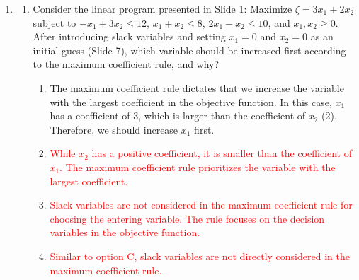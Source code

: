 \documentclass{article}%
\newcommand{\incorrect}[1]{\textcolor{red}{#1}}
\begin{document}
\begin{enumerate}
\begin{enumerate}
\item The correct answer is B. Pivoting is the core operation in the simplex method. It involves selecting a non-basic variable (the entering variable) to become basic and a basic variable (the leaving variable) to become non-basic. This is done based on specific rules to improve the objective function. Geometrically, this corresponds to moving from one vertex of the feasible region to an adjacent vertex.%
\item \incorrect{Incorrect. Pivoting does not involve solving the entire system of equations simultaneously; it involves a systematic substitution of variables.}%
\item \incorrect{Incorrect. Pivoting is a fundamental step in the simplex method regardless of whether the origin is feasible or not.}%
\item \incorrect{Incorrect. While matrix inversion is related to solving linear systems, pivoting in the simplex method does not explicitly involve calculating the inverse of the coefficient matrix.}%
\end{enumerate}%
\vspace{1em}%
\item%
\begin{enumerate}%
\item Consider the linear program presented in Slide 1: Maximize $\zeta = 3x_1 + 2x_2$ subject to $-x_1 + 3x_2 \le 12$, $x_1 + x_2 \le 8$, $2x_1 - x_2 \le 10$, and $x_1, x_2 \ge 0$.  After introducing slack variables and setting $x_1 = 0$ and $x_2 = 0$ as an initial guess (Slide 7), which variable should be increased first according to the maximum coefficient rule, and why?%
\begin{enumerate}%
\item The maximum coefficient rule dictates that we increase the variable with the largest coefficient in the objective function. In this case, $x_1$ has a coefficient of 3, which is larger than the coefficient of $x_2$ (2). Therefore, we should increase $x_1$ first.%
\item \incorrect{While $x_2$ has a positive coefficient, it is smaller than the coefficient of $x_1$. The maximum coefficient rule prioritizes the variable with the largest coefficient.}%
\item \incorrect{Slack variables are not considered in the maximum coefficient rule for choosing the entering variable. The rule focuses on the decision variables in the objective function.}%
\item \incorrect{Similar to option C, slack variables are not directly considered in the maximum coefficient rule.}%

\end{enumerate}
\end{enumerate}
\end{enumerate}
\end{document}
